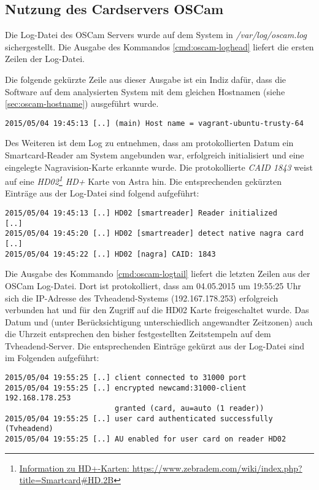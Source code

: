 \subsection{Nutzung des Cardservers OSCam}

Die Log-Datei des OSCam Servers wurde auf dem System in \textit{/var/log/oscam.log} sichergestellt. Die Ausgabe des Kommandos \autoref{cmd:oscam-loghead} liefert die ersten Zeilen der Log-Datei.

Die folgende gekürzte Zeile aus dieser Ausgabe ist ein Indiz dafür, dass die Software auf dem analysierten System mit dem gleichen Hostnamen (siehe \autoref{sec:oscam-hostname}) ausgeführt wurde.

\begin{verbatim}
2015/05/04 19:45:13 [..] (main) Host name = vagrant-ubuntu-trusty-64
\end{verbatim}

Des Weiteren ist dem Log zu entnehmen, dass am protokollierten Datum ein Smartcard-Reader am System angebunden war, erfolgreich initialisiert und eine eingelegte Nagravision-Karte erkannte wurde. Die protokollierte \textit{CAID 1843} weist auf eine \textit{HD02\footnote{\href{https://www.zebradem.com/wiki/index.php?title=Smartcard\#HD.2B}{Information zu HD+-Karten: https://www.zebradem.com/wiki/index.php?title=Smartcard\#HD.2B}} HD+} Karte von Astra hin. Die entsprechenden gekürzten Einträge aus der Log-Datei sind folgend aufgeführt:

\begin{verbatim}
2015/05/04 19:45:13 [..] HD02 [smartreader] Reader initialized
[..]
2015/05/04 19:45:20 [..] HD02 [smartreader] detect native nagra card
[..]
2015/05/04 19:45:22 [..] HD02 [nagra] CAID: 1843
\end{verbatim}

Die Ausgabe des Kommando \autoref{cmd:oscam-logtail} liefert die letzten Zeilen aus der OSCam Log-Datei. Dort ist protokolliert, dass am 04.05.2015 um 19:55:25 Uhr sich die IP-Adresse des Tvheadend-Systems (192.167.178.253) erfolgreich verbunden hat und für den Zugriff auf die HD02 Karte freigeschaltet wurde. Das Datum und (unter Berücksichtigung unterschiedlich angewandter Zeitzonen) auch die Uhrzeit entsprechen den bisher festgestellten Zeitstempeln auf dem Tvheadend-Server. Die entsprechenden Einträge gekürzt aus der Log-Datei sind im Folgenden aufgeführt:

\begin{verbatim}
2015/05/04 19:55:25 [..] client connected to 31000 port
2015/05/04 19:55:25 [..] encrypted newcamd:31000-client 192.168.178.253
                         granted (card, au=auto (1 reader))
2015/05/04 19:55:25 [..] user card authenticated successfully (Tvheadend)
2015/05/04 19:55:25 [..] AU enabled for user card on reader HD02
\end{verbatim}

